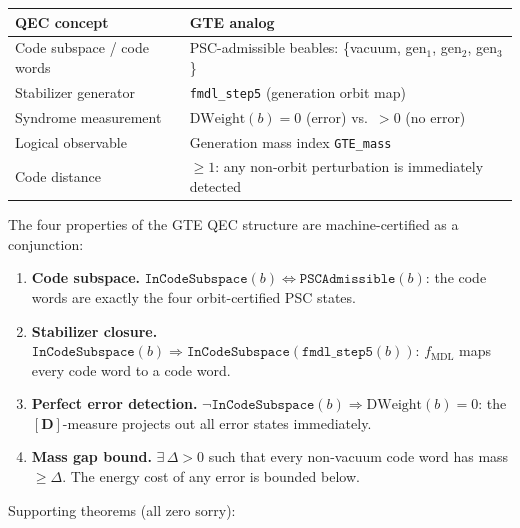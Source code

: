 \documentclass[11pt,a4paper]{article}
\newenvironment{keybox}[1]{%
  \Needspace*{8\baselineskip}%
  \begin{tcolorbox}[
    enhanced,
    breakable=false,
    colback=blue!5,
    colframe=blue!45!black,
    coltitle=black,
    colbacktitle=blue!14,
    boxrule=0.85pt,
    arc=2.5pt,
    left=9pt, right=9pt, top=6pt, bottom=6pt,
    titlerule=0.55pt,
    fonttitle=\bfseries,
    title={#1},
    before upper=\raggedright,
    before skip=0.9\baselineskip,
    after skip=0.9\baselineskip
  ]%
}{%
  \end{tcolorbox}%
}
\theoremstyle{definition}
\begin{document}
\begin{center}
\small
\begin{tabular}{@{}ll@{}}
\toprule
QEC concept & GTE analog \\
\midrule
Code subspace / code words & PSC-admissible beables: \{vacuum, gen$_1$, gen$_2$, gen$_3$\} \\
Stabilizer generator & \lstinline|fmdl_step5| (generation orbit map) \\
Syndrome measurement & $\mathrm{DWeight}(b) = 0$ (error) vs.\ $> 0$ (no error) \\
Logical observable & Generation mass index \lstinline|GTE_mass| \\
Code distance & $\geq 1$: any non-orbit perturbation is immediately detected \\
\bottomrule
\end{tabular}
\end{center}

\begin{keybox}{\lstinline|qec_gte_is_stabilizer_code| (zero sorry)}
The four properties of the GTE QEC structure are machine-certified as a
conjunction:
\begin{enumerate}[nosep]
\item \textbf{Code subspace.}
  $\texttt{InCodeSubspace}(b) \Leftrightarrow \texttt{PSCAdmissible}(b)$:
  the code words are exactly the four orbit-certified PSC states.
\item \textbf{Stabilizer closure.}
  $\texttt{InCodeSubspace}(b) \Rightarrow \texttt{InCodeSubspace}(\texttt{fmdl\_step5}(b))$:
  $f_{\mathrm{MDL}}$ maps every code word to a code word.
\item \textbf{Perfect error detection.}
  $\neg\texttt{InCodeSubspace}(b) \Rightarrow \mathrm{DWeight}(b) = 0$:
  the $[\mathbf{D}]$-measure projects out all error states immediately.
\item \textbf{Mass gap bound.}
  $\exists\,\Delta > 0$ such that every non-vacuum code word has
  mass $\geq \Delta$.  The energy cost of any error is bounded below.
\end{enumerate}
\end{keybox}

Supporting theorems (all zero sorry):
\end{document}
